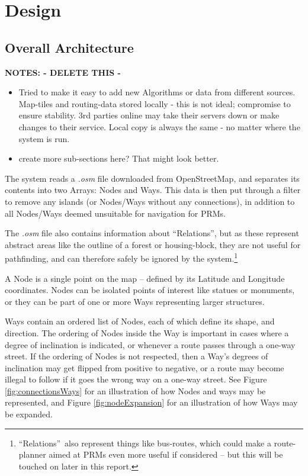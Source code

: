 
\chapter{Design}

\section{Overall Architecture}
\textbf{NOTES: - DELETE THIS -}
\begin{itemize}
\item Tried to make it easy to add new Algorithms or data from different sources. Map-tiles and routing-data stored locally - this is not ideal; compromise to ensure stability. 3rd parties online may take their servers down or make changes to their service. Local copy is always the same - no matter where the system is run.
\item create more sub-sections here? That might look better.
\end{itemize}

The system reads a \textit{.osm} file\cite{OSM-XML} downloaded from OpenStreetMap\cite{OSM}, and separates its contents into two Arrays: Nodes and Ways. This data is then put through a filter to remove any islands (or Nodes/Ways without any connections), in addition to all Nodes/Ways deemed unsuitable for navigation for PRMs.

The \textit{.osm} file also contains information about \textquotedblleft Relations\textquotedblright, but as these represent abstract areas like the outline of a forest or housing-block, they are not useful for pathfinding, and can therefore safely be ignored by the system.\footnote{\textquotedblleft Relations\textquotedblright~also represent things like bus-routes, which could make a route-planner aimed at PRMs even more useful if considered -- but this will be touched on later in this report.}

A Node is a single point on the map -- defined by its Latitude and Longitude coordinates. Nodes can be isolated points of interest like statues or monuments, or they can be part of one or more Ways representing larger structures.

Ways contain an ordered list of Nodes, each of which define its shape, and direction. The ordering of Nodes inside the Way is important in cases where a degree of inclination is indicated, or whenever a route passes through a one-way street.
If the ordering of Nodes is not respected, then a Way's degrees of inclination may get flipped from positive to negative, or a route may become illegal to follow if it goes the wrong way on a one-way street. See Figure \ref{fig:connectionsWays} for an illustration of how Nodes and ways may be represented, and Figure \ref{fig:nodeExpansion} for an illustration of how Ways may be expanded.

